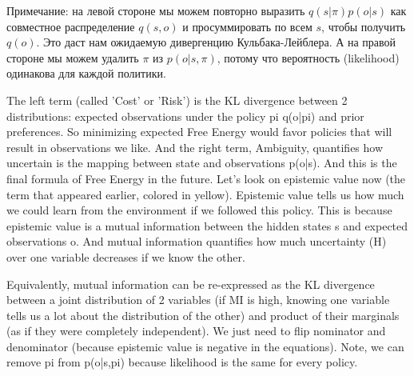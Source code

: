\documentclass[12pt]{article}
\begin{document}
Примечание: на левой стороне мы можем повторно выразить $q(s|\pi) p(o|s)$ как совместное распределение $q(s,o)$ и просуммировать по всем $s$, чтобы получить $q(o)$. Это даст нам ожидаемую дивергенцию Кульбака-Лейблера. А на правой стороне мы можем удалить $\pi$ из $p(o|s,\pi)$, потому что вероятность (likelihood) одинакова для каждой политики.


The left term (called 'Cost' or 'Risk') is the KL divergence between 2 distributions: expected observations under the policy pi q(o|pi) and prior preferences. So minimizing expected Free Energy would favor policies that will result in observations we like. And the right term, Ambiguity, quantifies how uncertain is the mapping between state and observations p(o|s). And this is the final formula of Free Energy in the future. Let's look on epistemic value now (the term that appeared earlier, colored in yellow).
Epistemic value tells us how much we could learn from the environment if we followed this policy. This is because epistemic value is a mutual information between the hidden states s and expected observations o. And mutual information quantifies how much uncertainty (H) over one variable decreases if we know the other.

Equivalently, mutual information can be re-expressed as the KL divergence between a joint distribution of 2 variables (if MI is high, knowing one variable tells us a lot about the distribution of the other) and product of their marginals (as if they were completely independent). We just need to flip nominator and denominator (because epistemic value is negative in the equations). Note, we can remove pi from p(o|s,pi) because likelihood is the same for every policy.
\end{document}
